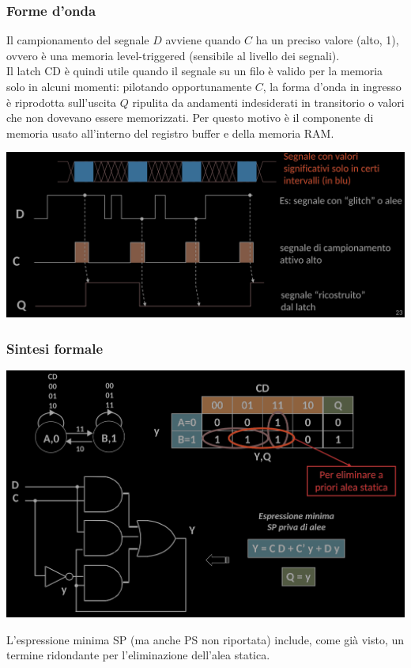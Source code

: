 \documentclass{article}
\begin{document}
\subsubsection{Forme d'onda}
Il campionamento del segnale $D$ avviene quando $C$ ha un preciso valore (alto, 1), ovvero è una memoria level-triggered (sensibile al livello dei segnali).\\
Il latch CD è quindi utile quando il segnale su un filo è valido per la memoria solo in alcuni momenti: pilotando opportunamente $C$, la forma d’onda in ingresso è riprodotta sull’uscita $Q$ ripulita da andamenti indesiderati in transitorio o valori che non dovevano essere memorizzati. Per questo motivo è il componente di memoria usato all’interno del registro buffer e della memoria RAM.
\begin{center}
    \includegraphics[scale=0.3]{latchCD-grafico.png}
\end{center}
\subsubsection*{Sintesi formale}
\begin{center}
    \includegraphics[scale=0.35]{latchCD-sintesi.png}
\end{center}
L’espressione minima SP (ma anche PS non riportata) include, come già visto, un termine ridondante per l’eliminazione dell’alea statica.
\end{document}
